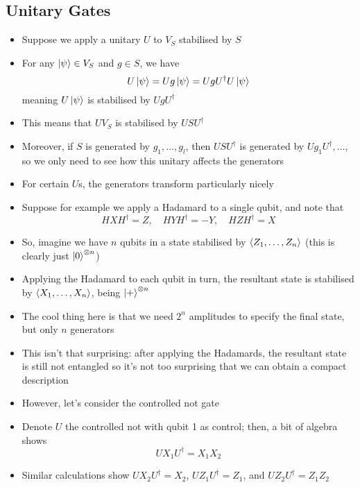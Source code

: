 \documentclass[12pt,a4paper]{article}
\numberwithin{equation}{section}
\begin{document}
	\subsection{Unitary Gates}
	\begin{itemize}
		\item Suppose we apply a unitary $U$ to $V_{S}$ stabilised by $S$
		\item For any $\ket{\psi}\in V_{S}$ and $g\in S$, we have
		\begin{equation}
			U\ket{\psi}=Ug\ket{\psi}=UgU^{\dagger}U\ket{\psi}
		\end{equation}
		meaning $U\ket{\psi}$ is stabilised by $UgU^{\dagger}$
		\item This means that $UV_{S}$ is stabilised by $USU^{\dagger}$
		\item Moreover, if $S$ is generated by $g_{1},\ldots, g_{l}$, then $USU^{\dagger}$ is generated by $Ug_{1}U^{\dagger},\ldots$, so we only need to see how this unitary affects the generators
		\item For certain $U$s, the generators transform particularly nicely
		\item Suppose for example we apply a Hadamard to a single qubit, and note that
		\begin{equation}
			HXH^{\dagger}=Z,\quad HYH^{\dagger}=-Y,\quad HZH^{\dagger}=X
		\end{equation}
		\item So, imagine we have $n$ qubits in a state stabilised by $\braket{Z_{1},\ldots,Z_{n}}$ (this is clearly just $\ket{0}^{\otimes n}$)
		\item Applying the Hadamard to each qubit in turn, the resultant state is stabilised by $\braket{X_{1},\ldots,X_{n}}$, being $\ket{+}^{\otimes n}$
		\item The cool thing here is that we need $2^{n}$ amplitudes to specify the final state, but only $n$ generators
		\item This isn't that surprising: after applying the Hadamards, the resultant state is still not entangled so it's not too surprising that we can obtain a compact description
		\item However, let's consider the controlled not gate
		\item Denote $U$ the controlled not with qubit 1 as control; then, a bit of algebra shows
		\begin{equation}
			UX_{1}U^{\dagger}=X_{1}X_{2}
		\end{equation}
		\item Similar calculations show $UX_{2}U^{\dagger}=X_{2}$, $UZ_{1}U^{\dagger}=Z_{1}$, and $UZ_{2}U^{\dagger}=Z_{1}Z_{2}$

\end{itemize}
\end{document}
